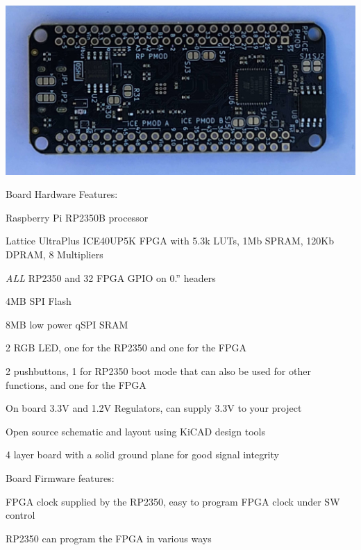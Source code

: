  
\begin{DoxyInlineImage}
\includegraphics[height=\baselineskip,keepaspectratio=true]{pico2_ice_back.jpg}
\end{DoxyInlineImage}
   

Board Hardware Features\+:


\begin{DoxyItemize}
\item Raspberry Pi RP2350B processor
\item Lattice Ultra\+Plus ICE40\+UP5K FPGA with 5.\+3k LUTs, 1Mb SPRAM, 120Kb DPRAM, 8 Multipliers
\item {\itshape ALL} RP2350 and 32 FPGA GPIO on 0.” headers
\item 4MB SPI Flash
\item 8MB low power q\+SPI SRAM
\item 2 RGB LED, one for the RP2350 and one for the FPGA
\item 2 pushbuttons, 1 for RP2350 boot mode that can also be used for other functions, and one for the FPGA
\item On board 3.\+3V and 1.\+2V Regulators, can supply 3.\+3V to your project
\item Open source schematic and layout using Ki\+CAD design tools
\item 4 layer board with a solid ground plane for good signal integrity
\end{DoxyItemize}

Board Firmware features\+:


\begin{DoxyItemize}
\item FPGA clock supplied by the RP2350, easy to program FPGA clock under SW control
\item RP2350 can program the FPGA in various ways
\end{DoxyItemize}

